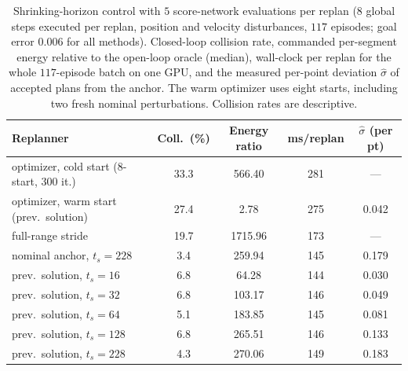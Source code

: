 \begin{table}[t]
\centering
\caption{Shrinking-horizon control with $5$ score-network evaluations per replan ($8$ global steps executed per replan, position and velocity disturbances, $117$ episodes; goal error $0.006$ for all methods).  Closed-loop collision rate, commanded per-segment energy relative to the open-loop oracle (median), wall-clock per replan for the whole $117$-episode batch on one GPU, and the measured per-point deviation $\hat\sigma$ of accepted plans from the anchor.  The warm optimizer uses eight starts, including two fresh nominal perturbations.  Collision rates are descriptive.}
\label{tab:mpc}
\begin{tabular}{lcccc}
\toprule
Replanner & Coll.\ (\%) & Energy ratio & ms/replan & $\hat\sigma$ (per pt) \\
\midrule
optimizer, cold start (8-start, 300 it.) & 33.3 & 566.40 & 281 & --- \\
optimizer, warm start (prev.\ solution) & 27.4 & 2.78 & 275 & 0.042 \\
full-range stride & 19.7 & 1715.96 & 173 & --- \\
nominal anchor, $t_s=228$ & 3.4 & 259.94 & 145 & 0.179 \\
prev.\ solution, $t_s=16$ & 6.8 & 64.28 & 144 & 0.030 \\
prev.\ solution, $t_s=32$ & 6.8 & 103.17 & 146 & 0.049 \\
prev.\ solution, $t_s=64$ & 5.1 & 183.85 & 145 & 0.081 \\
prev.\ solution, $t_s=128$ & 6.8 & 265.51 & 146 & 0.133 \\
prev.\ solution, $t_s=228$ & 4.3 & 270.06 & 149 & 0.183 \\
\bottomrule
\end{tabular}
\end{table}

